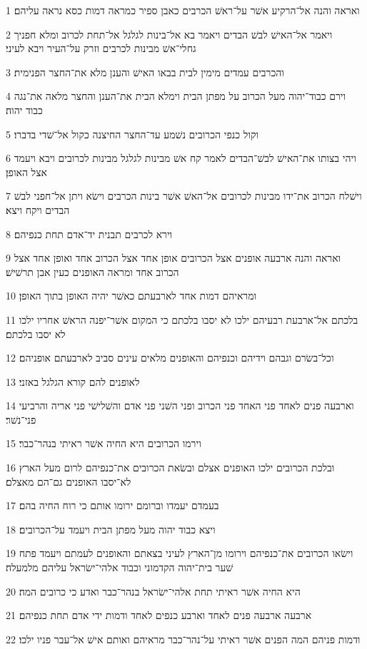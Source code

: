\par 1 ואראה והנה אל־הרקיע אשׁר על־ראשׁ הכרבים כאבן ספיר כמראה דמות כסא נראה עליהם׃
\par 2 ויאמר אל־האישׁ לבשׁ הבדים ויאמר בא אל־בינות לגלגל אל־תחת לכרוב ומלא חפניך גחלי־אשׁ מבינות לכרבים וזרק על־העיר ויבא לעיני׃
\par 3 והכרבים עמדים מימין לבית בבאו האישׁ והענן מלא את־החצר הפנימית׃
\par 4 וירם כבוד־יהוה מעל הכרוב על מפתן הבית וימלא הבית את־הענן והחצר מלאה את־נגה כבוד יהוה׃
\par 5 וקול כנפי הכרובים נשׁמע עד־החצר החיצנה כקול אל־שׁדי בדברו׃
\par 6 ויהי בצותו את־האישׁ לבשׁ־הבדים לאמר קח אשׁ מבינות לגלגל מבינות לכרובים ויבא ויעמד אצל האופן׃
\par 7 וישׁלח הכרוב את־ידו מבינות לכרובים אל־האשׁ אשׁר בינות הכרבים וישׂא ויתן אל־חפני לבשׁ הבדים ויקח ויצא׃
\par 8 וירא לכרבים תבנית יד־אדם תחת כנפיהם׃
\par 9 ואראה והנה ארבעה אופנים אצל הכרובים אופן אחד אצל הכרוב אחד ואופן אחד אצל הכרוב אחד ומראה האופנים כעין אבן תרשׁישׁ׃
\par 10 ומראיהם דמות אחד לארבעתם כאשׁר יהיה האופן בתוך האופן׃
\par 11 בלכתם אל־ארבעת רבעיהם ילכו לא יסבו בלכתם כי המקום אשׁר־יפנה הראשׁ אחריו ילכו לא יסבו בלכתם׃
\par 12 וכל־בשׂרם וגבהם וידיהם וכנפיהם והאופנים מלאים עינים סביב לארבעתם אופניהם׃
\par 13 לאופנים להם קורא הגלגל באזני׃
\par 14 וארבעה פנים לאחד פני האחד פני הכרוב ופני השׁני פני אדם והשׁלישׁי פני אריה והרביעי פני־נשׁר׃
\par 15 וירמו הכרובים היא החיה אשׁר ראיתי בנהר־כבר׃
\par 16 ובלכת הכרובים ילכו האופנים אצלם ובשׂאת הכרובים את־כנפיהם לרום מעל הארץ לא־יסבו האופנים גם־הם מאצלם׃
\par 17 בעמדם יעמדו וברומם ירומו אותם כי רוח החיה בהם׃
\par 18 ויצא כבוד יהוה מעל מפתן הבית ויעמד על־הכרובים׃
\par 19 וישׂאו הכרובים את־כנפיהם וירומו מן־הארץ לעיני בצאתם והאופנים לעמתם ויעמד פתח שׁער בית־יהוה הקדמוני וכבוד אלהי־ישׂראל עליהם מלמעלה׃
\par 20 היא החיה אשׁר ראיתי תחת אלהי־ישׂראל בנהר־כבר ואדע כי כרובים המה׃
\par 21 ארבעה ארבעה פנים לאחד וארבע כנפים לאחד ודמות ידי אדם תחת כנפיהם׃
\par 22 ודמות פניהם המה הפנים אשׁר ראיתי על־נהר־כבר מראיהם ואותם אישׁ אל־עבר פניו ילכו׃

